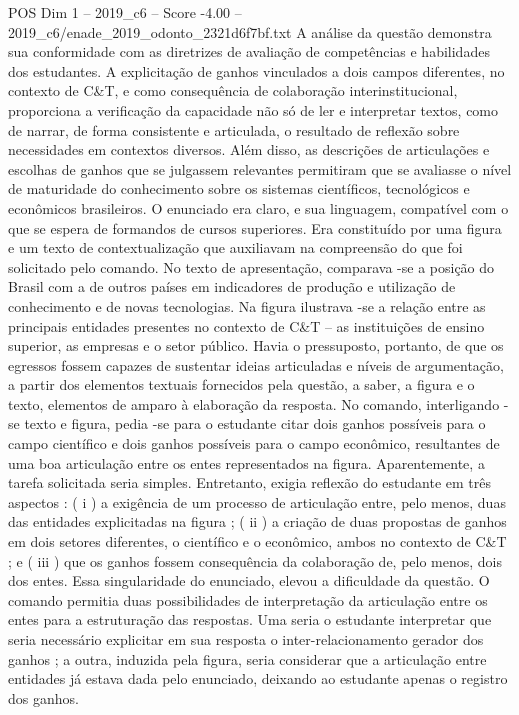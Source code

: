 \begin{textsample}{POS Dim 1 – 2019\_c6 – Score -4.00 – 2019\_c6/enade\_2019\_odonto\_2321d6f7bf.txt}
A análise da questão demonstra sua conformidade com as diretrizes de avaliação de competências e habilidades dos estudantes.
A explicitação de ganhos vinculados a dois campos diferentes, no contexto de C\&T, e como consequência de colaboração interinstitucional, proporciona a verificação da capacidade não só de ler e interpretar textos, como de narrar, de forma consistente e articulada, o resultado de reflexão sobre necessidades em contextos diversos.
Além disso, as descrições de articulações e escolhas de ganhos que se julgassem relevantes permitiram que se avaliasse o nível de maturidade do conhecimento sobre os sistemas científicos, tecnológicos e econômicos brasileiros.
O enunciado era claro, e sua linguagem, compatível com o que se espera de formandos de cursos superiores.
Era constituído por uma figura e um texto de contextualização que auxiliavam na compreensão do que foi solicitado pelo comando.
No texto de apresentação, comparava -se a posição do Brasil com a de outros países em indicadores de produção e utilização de conhecimento e de novas tecnologias.
Na figura ilustrava -se a relação entre as principais entidades presentes no contexto de C\&T – as instituições de ensino superior, as empresas e o setor público.
Havia o pressuposto, portanto, de que os egressos fossem capazes de sustentar ideias articuladas e níveis de argumentação, a partir dos elementos textuais fornecidos pela questão, a saber, a figura e o texto, elementos de amparo à elaboração da resposta.
No comando, interligando -se texto e figura, pedia -se para o estudante citar dois ganhos possíveis para o campo científico e dois ganhos possíveis para o campo econômico, resultantes de uma boa articulação entre os entes representados na figura.
Aparentemente, a tarefa solicitada seria simples.
Entretanto, exigia reflexão do estudante em três aspectos : ( i ) a exigência de um processo de articulação entre, pelo menos, duas das entidades explicitadas na figura ; ( ii ) a criação de duas propostas de ganhos em dois setores diferentes, o científico e o econômico, ambos no contexto de C\&T ; e ( iii ) que os ganhos fossem consequência da colaboração de, pelo menos, dois dos entes.
Essa singularidade do enunciado, elevou a dificuldade da questão.
O comando permitia duas possibilidades de interpretação da articulação entre os entes para a estruturação das respostas.
Uma seria o estudante interpretar que seria necessário explicitar em sua resposta o inter-relacionamento gerador dos ganhos ; a outra, induzida pela figura, seria considerar que a articulação entre entidades já estava dada pelo enunciado, deixando ao estudante apenas o registro dos ganhos.

\end{textsample}

